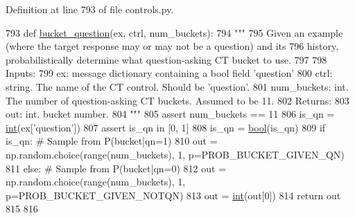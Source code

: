 Definition at line 793 of file controls.\+py.


\begin{DoxyCode}
793 \textcolor{keyword}{def }\hyperlink{namespaceprojects_1_1controllable__dialogue_1_1controllable__seq2seq_1_1controls_ab3bad4782be153fd04645ff419024311}{bucket\_question}(ex, ctrl, num\_buckets):
794     \textcolor{stringliteral}{"""}
795 \textcolor{stringliteral}{    Given an example (where the target response may or may not be a question) and its}
796 \textcolor{stringliteral}{    history, probabilistically determine what question-asking CT bucket to use.}
797 \textcolor{stringliteral}{}
798 \textcolor{stringliteral}{    Inputs:}
799 \textcolor{stringliteral}{      ex: message dictionary containing a bool field 'question'}
800 \textcolor{stringliteral}{      ctrl: string. The name of the CT control. Should be 'question'.}
801 \textcolor{stringliteral}{      num\_buckets: int. The number of question-asking CT buckets. Assumed to be 11.}
802 \textcolor{stringliteral}{    Returns:}
803 \textcolor{stringliteral}{      out: int. bucket number.}
804 \textcolor{stringliteral}{    """}
805     \textcolor{keyword}{assert} num\_buckets == 11
806     is\_qn = \hyperlink{namespacelanguage__model_1_1eval__ppl_a7d12ee00479673c5c8d1f6d01faa272a}{int}(ex[\textcolor{stringliteral}{'question'}])
807     \textcolor{keyword}{assert} is\_qn \textcolor{keywordflow}{in} [0, 1]
808     is\_qn = \hyperlink{namespaceprojects_1_1mastering__the__dungeon_1_1mturk_1_1tasks_1_1MTD_1_1run_a6fc0c9b519a36f82b65bcd398f1fbb9d}{bool}(is\_qn)
809     \textcolor{keywordflow}{if} is\_qn:  \textcolor{comment}{# Sample from P(bucket|qn=1)}
810         out = np.random.choice(range(num\_buckets), 1, p=PROB\_BUCKET\_GIVEN\_QN)
811     \textcolor{keywordflow}{else}:  \textcolor{comment}{# Sample from P(bucket|qn=0)}
812         out = np.random.choice(range(num\_buckets), 1, p=PROB\_BUCKET\_GIVEN\_NOTQN)
813     out = \hyperlink{namespacelanguage__model_1_1eval__ppl_a7d12ee00479673c5c8d1f6d01faa272a}{int}(out[0])
814     \textcolor{keywordflow}{return} out
815 
816 
\end{DoxyCode}
\mbox{\label{namespaceprojects_1_1controllable__dialogue_1_1controllable__seq2seq_1_1controls_a9ff7f284ebe0c571ce6335d4aab2bb36}} 
